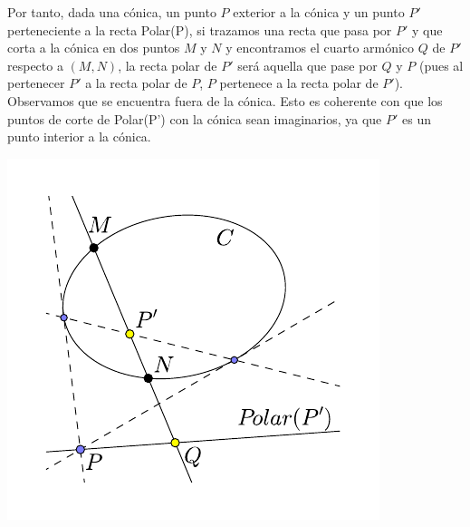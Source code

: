 Por tanto, dada una cónica, un punto $P$ exterior a la cónica y un punto $P'$ perteneciente a la recta Polar(P), si trazamos una recta que pasa por $P'$ y que corta a la cónica en dos puntos $M$ y $N$ y encontramos el cuarto armónico $Q$ de $P'$ respecto a $(M,N)$, la recta polar de $P'$ será aquella que pase por $Q$ y $P$ (pues al pertenecer $P'$ a la recta polar de $P$, $P$ pertenece a la recta polar de $P'$). Observamos que se encuentra fuera de la cónica. Esto es coherente con que los puntos de corte de Polar(P') con la cónica sean imaginarios, ya que $P'$ es un punto interior a la cónica.
\begin{center}
	\includegraphics[scale=.8]{Graficos/Conicas/PolarInterior}
\end{center}

